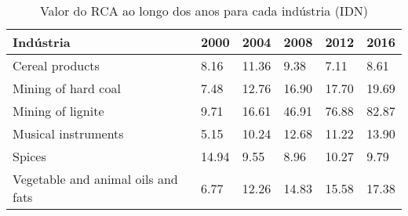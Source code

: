 \begin{table}
\centering
\caption{Valor do RCA ao longo dos anos para cada indústria (IDN)}
\begin{tabular}{p{6cm}p{1.5cm}p{1.5cm}p{1.5cm}p{1.5cm}p{1.5cm}}
\toprule
                         Indústria &  2000 &  2004 &  2008 &  2012 &  2016 \\
\midrule
                   Cereal products &  8.16 & 11.36 &  9.38 &  7.11 &  8.61 \\
               Mining of hard coal &  7.48 & 12.76 & 16.90 & 17.70 & 19.69 \\
                 Mining of lignite &  9.71 & 16.61 & 46.91 & 76.88 & 82.87 \\
               Musical instruments &  5.15 & 10.24 & 12.68 & 11.22 & 13.90 \\
                            Spices & 14.94 &  9.55 &  8.96 & 10.27 &  9.79 \\
Vegetable and animal oils and fats &  6.77 & 12.26 & 14.83 & 15.58 & 17.38 \\
\bottomrule
\end{tabular}
\end{table}
